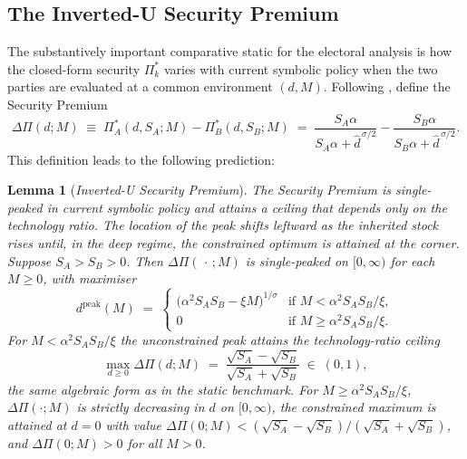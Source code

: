 \documentclass[11pt,twoside]{extarticle}
\newtheorem{lemma}{Lemma}
\begin{document}
\subsection{The Inverted-U Security Premium}\label{subsec:invU_v3}

The substantively important comparative static for the electoral analysis is how the closed-form security $\Pi_k^*$ varies with current symbolic policy when the two parties are evaluated at a common environment $(d,M)$. Following \citet{barutSymmetricMultiplePrize1998}, define the Security Premium
\begin{equation}\label{eq:security_premium_v3}
    \Delta\Pi(d;M)\;\equiv\;\Pi_A^*(d,S_A;M)-\Pi_B^*(d,S_B;M)
    \;=\;\frac{S_A\alpha}{S_A\alpha+\hat d^{\,\sigma/2}}-\frac{S_B\alpha}{S_B\alpha+\hat d^{\,\sigma/2}}.
\end{equation}
This definition leads to the following prediction:

\begin{lemma}[\emph{Inverted-U Security Premium}]\label{lem:invU_v3}
\emph{The Security Premium is single-peaked in current symbolic policy and attains a ceiling that depends only on the technology ratio. The location of the peak shifts leftward as the inherited stock rises until, in the deep regime, the constrained optimum is attained at the corner.}
Suppose $S_A>S_B>0$. Then $\Delta\Pi(\,\cdot\,;M)$ is single-peaked on $[0,\infty)$ for each $M\ge 0$, with maximiser
\begin{equation}\label{eq:dpeak_v3}
    d^{\mathrm{peak}}(M)\;=\;\begin{cases}
        \big(\alpha^2 S_A S_B-\xi M\big)^{1/\sigma} & \text{if }M<\alpha^2 S_A S_B/\xi,\\[2pt]
        0 & \text{if }M\ge\alpha^2 S_A S_B/\xi.
    \end{cases}
\end{equation}
For $M<\alpha^2 S_A S_B/\xi$ the unconstrained peak attains the technology-ratio ceiling
\begin{equation}\label{eq:DPi_peak_v3}
    \max_{d\ge 0}\Delta\Pi(d;M)\;=\;\frac{\sqrt{S_A}-\sqrt{S_B}}{\sqrt{S_A}+\sqrt{S_B}}\;\in\;(0,1),
\end{equation}
the same algebraic form as in the static benchmark. For $M\ge\alpha^2 S_A S_B/\xi$, $\Delta\Pi(\cdot;M)$ is strictly decreasing in $d$ on $[0,\infty)$, the constrained maximum is attained at $d=0$ with value $\Delta\Pi(0;M)<(\sqrt{S_A}-\sqrt{S_B})/(\sqrt{S_A}+\sqrt{S_B})$, and $\Delta\Pi(0;M)>0$ for all $M>0$.
\end{lemma}
\end{document}
